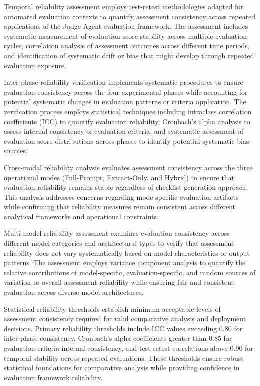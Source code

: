 Temporal reliability assessment employs test-retest methodologies adapted for automated evaluation contexts to quantify assessment consistency across repeated applications of the Judge Agent evaluation framework. The assessment includes systematic measurement of evaluation score stability across multiple evaluation cycles, correlation analysis of assessment outcomes across different time periods, and identification of systematic drift or bias that might develop through repeated evaluation exposure.

Inter-phase reliability verification implements systematic procedures to ensure evaluation consistency across the four experimental phases while accounting for potential systematic changes in evaluation patterns or criteria application. The verification process employs statistical techniques including intraclass correlation coefficients (ICC) to quantify evaluation reliability, Cronbach's alpha analysis to assess internal consistency of evaluation criteria, and systematic assessment of evaluation score distributions across phases to identify potential systematic bias sources.

Cross-modal reliability analysis evaluates assessment consistency across the three operational modes (Full-Prompt, Extract-Only, and Hybrid) to ensure that evaluation reliability remains stable regardless of checklist generation approach. This analysis addresses concerns regarding mode-specific evaluation artifacts while confirming that reliability measures remain consistent across different analytical frameworks and operational constraints.

Multi-model reliability assessment examines evaluation consistency across different model categories and architectural types to verify that assessment reliability does not vary systematically based on model characteristics or output patterns. The assessment employs variance component analysis to quantify the relative contributions of model-specific, evaluation-specific, and random sources of variation to overall assessment reliability while ensuring fair and consistent evaluation across diverse model architectures.

Statistical reliability thresholds establish minimum acceptable levels of assessment consistency required for valid comparative analysis and deployment decisions. Primary reliability thresholds include ICC values exceeding 0.80 for inter-phase consistency, Cronbach's alpha coefficients greater than 0.85 for evaluation criteria internal consistency, and test-retest correlations above 0.90 for temporal stability across repeated evaluations. These thresholds ensure robust statistical foundations for comparative analysis while providing confidence in evaluation framework reliability.

